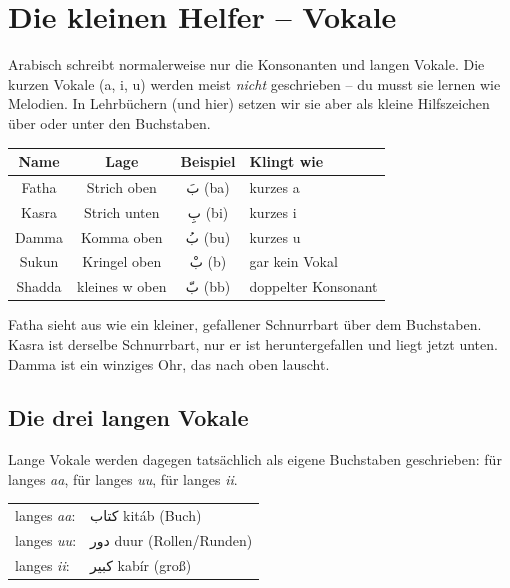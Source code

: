 
\chapter{Die kleinen Helfer -- Vokale}

Arabisch schreibt normalerweise nur die Konsonanten und langen Vokale.
Die kurzen Vokale (a, i, u) werden meist \emph{nicht} geschrieben -- du musst
sie lernen wie Melodien. In Lehrbüchern (und hier) setzen wir sie aber als
kleine Hilfszeichen über oder unter den Buchstaben.

\begin{center}
\renewcommand{\arraystretch}{2}
\begin{tabular}{cccl}
\textbf{Name} & \textbf{Lage} & \textbf{Beispiel} & \textbf{Klingt wie} \\
\hline
Fatha & Strich oben & \textarabic{\Large بَ} (ba) & kurzes a \\
Kasra & Strich unten & \textarabic{\Large بِ} (bi) & kurzes i \\
Damma & Komma oben & \textarabic{\Large بُ} (bu) & kurzes u \\
Sukun & Kringel oben & \textarabic{\Large بْ} (b) & gar kein Vokal \\
Shadda & kleines w oben & \textarabic{\Large بّ} (bb) & doppelter Konsonant \\
\end{tabular}
\end{center}

\begin{lachbox}
Fatha sieht aus wie ein kleiner, gefallener Schnurrbart über dem
Buchstaben. Kasra ist derselbe Schnurrbart, nur er ist heruntergefallen
und liegt jetzt unten. Damma ist ein winziges Ohr, das nach oben lauscht.
\end{lachbox}

\section*{Die drei langen Vokale}

Lange Vokale werden dagegen tatsächlich als eigene Buchstaben geschrieben:
 für langes \emph{aa},  für langes \emph{uu}, 
für langes \emph{ii}.

\begin{center}
\begin{tabular}{ll}
langes \textit{aa}: & \textarabic{\Large كتاب} \quad kit\'ab (Buch) \\
langes \textit{uu}: & \textarabic{\Large دور} \quad duur (Rollen/Runden) \\
langes \textit{ii}: & \textarabic{\Large كبير} \quad kab\'ir (groß) \\
\end{tabular}
\end{center}

